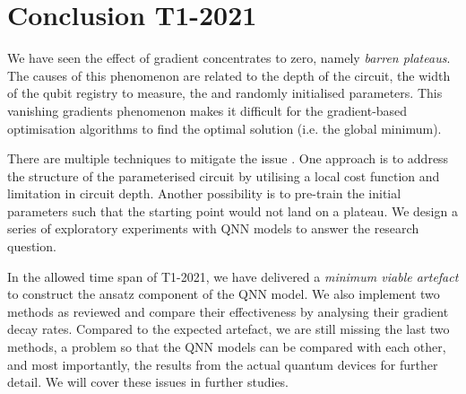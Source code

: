 \section{Conclusion T1-2021}
We have seen the effect of gradient concentrates to zero, namely \emph{barren plateaus}.
The causes of this phenomenon are related to the depth of the circuit, the width of the qubit registry to measure, the and randomly initialised parameters.
This vanishing gradients phenomenon makes it difficult for the gradient-based optimisation algorithms to find the optimal solution (i.e. the global minimum).

There are multiple techniques to mitigate the issue \cite{cerezoCostFunctionDependent2021,skolikLayerwiseLearningQuantum2021,grantInitializationStrategyAddressing2019}.
One approach is to address the structure of the parameterised circuit by utilising a local cost function and limitation in circuit depth.
Another possibility is to pre-train the initial parameters such that the starting point would not land on a plateau.
We design a series of exploratory experiments with QNN models to answer the research question.

In the allowed time span of T1-2021, we have delivered a \emph{minimum viable artefact} to construct the ansatz component of the QNN model.
We also implement two methods as reviewed and compare their effectiveness by analysing their gradient decay rates.
Compared to the expected artefact, we are still missing the last two methods, a problem so that the QNN models can be compared with each other, and most importantly, the results from the actual quantum devices  for further detail.
We will cover these issues in further studies.